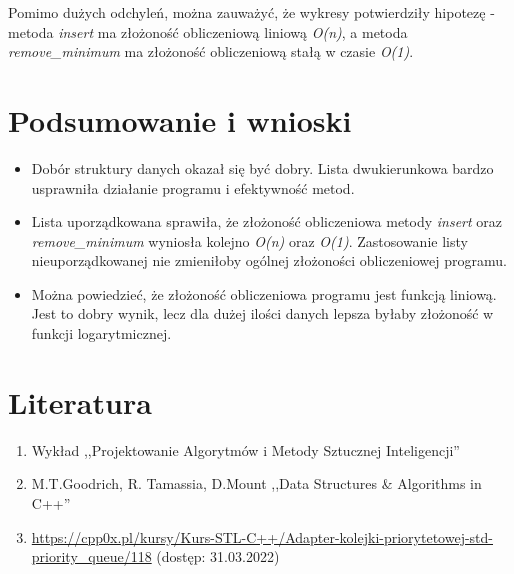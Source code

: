 \documentclass[12pt]{article}
\begin{document}
Pomimo dużych odchyleń, można zauważyć, że wykresy potwierdziły hipotezę - metoda \textit{insert} ma złożoność obliczeniową 
liniową \textit{O(n)}, a metoda \textit{remove\_minimum} ma złożoność obliczeniową stałą w czasie 
\textit{O(1)}.

\section{Podsumowanie i wnioski}
\begin{itemize}
    \item Dobór struktury danych okazał się być dobry. Lista dwukierunkowa bardzo usprawniła działanie programu i 
    efektywność metod.
    \item Lista uporządkowana sprawiła, że złożoność obliczeniowa metody \textit{insert} oraz \textit{remove\_minimum}
    wyniosła kolejno \textit{O(n)} oraz \textit{O(1)}. Zastosowanie listy nieuporządkowanej nie zmieniłoby ogólnej 
    złożoności obliczeniowej programu. 
    \item Można powiedzieć, że złożoność obliczeniowa programu jest funkcją liniową. Jest to dobry wynik, lecz dla 
    dużej ilości danych lepsza byłaby złożoność w funkcji logarytmicznej.
\end{itemize}


\section{Literatura}
\begin{enumerate}
    \footnotesize
    \item Wykład ,,Projektowanie Algorytmów i Metody Sztucznej Inteligencji''
    \item M.T.Goodrich, R. Tamassia, D.Mount ,,Data Structures \& Algorithms in C++''
    \item \url{ https://cpp0x.pl/kursy/Kurs-STL-C++/Adapter-kolejki-priorytetowej-std-priority_queue/118} (dostęp: 31.03.2022)
\end{enumerate}
\end{document}
